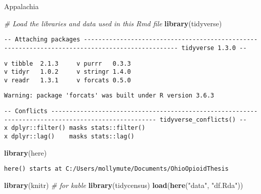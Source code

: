 \documentclass[12pt,twoside]{reedthesis}
\newenvironment{Shaded}{\begin{snugshade}}{\end{snugshade}}
\newcommand{\CommentTok}[1]{\textcolor[rgb]{0.56,0.35,0.01}{\textit{#1}}}
\newcommand{\KeywordTok}[1]{\textcolor[rgb]{0.13,0.29,0.53}{\textbf{#1}}}
\newcommand{\NormalTok}[1]{#1}
\newcommand{\StringTok}[1]{\textcolor[rgb]{0.31,0.60,0.02}{#1}}
\begin{document}
Appalachia
\begin{Shaded}
\begin{Highlighting}[]
\CommentTok{# Load the libraries and data used in this Rmd file}
\KeywordTok{library}\NormalTok{(tidyverse)}
\end{Highlighting}
\end{Shaded}
\begin{verbatim}
-- Attaching packages ------------------------------------------------------------------------------------------------ tidyverse 1.3.0 --
\end{verbatim}
\begin{verbatim}
v tibble  2.1.3     v purrr   0.3.3
v tidyr   1.0.2     v stringr 1.4.0
v readr   1.3.1     v forcats 0.5.0
\end{verbatim}
\begin{verbatim}
Warning: package 'forcats' was built under R version 3.6.3
\end{verbatim}
\begin{verbatim}
-- Conflicts --------------------------------------------------------------------------------------------------- tidyverse_conflicts() --
x dplyr::filter() masks stats::filter()
x dplyr::lag()    masks stats::lag()
\end{verbatim}
\begin{Shaded}
\begin{Highlighting}[]
\KeywordTok{library}\NormalTok{(here)}
\end{Highlighting}
\end{Shaded}
\begin{verbatim}
here() starts at C:/Users/mollymute/Documents/OhioOpioidThesis
\end{verbatim}
\begin{Shaded}
\begin{Highlighting}[]
\KeywordTok{library}\NormalTok{(knitr) }\CommentTok{# for kable}
\KeywordTok{library}\NormalTok{(tidycensus)}
\KeywordTok{load}\NormalTok{(}\KeywordTok{here}\NormalTok{(}\StringTok{"data"}\NormalTok{, }\StringTok{"df.Rda"}\NormalTok{))}
\end{Highlighting}
\end{Shaded}
\end{document}
